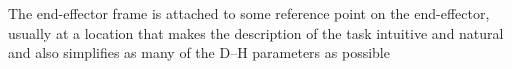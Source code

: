 \documentclass[preview]{standalone}
\begin{document}
\begin{center}
The end-effector frame is attached to some reference point on the end-effector, usually at a location that makes the description of the task intuitive and natural and also simplifies as many of the D–H parameters as possible
\end{center}
\end{document}
